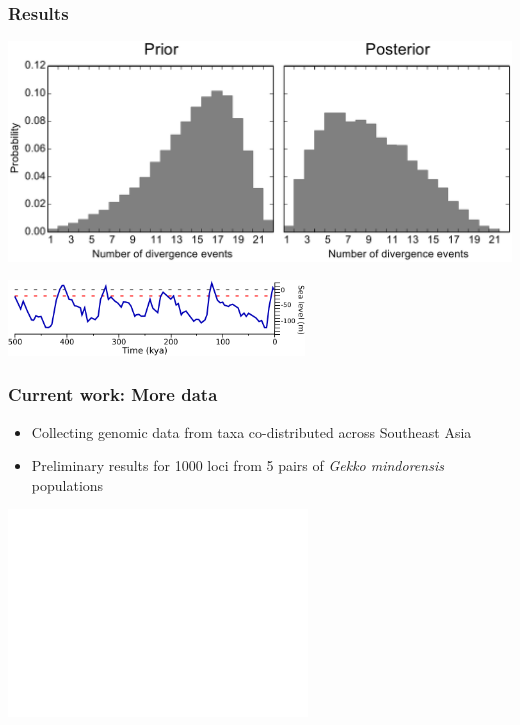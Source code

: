 \begin{frame}
    \frametitle{Results}
    \centerline{
    \includegraphics[width=\textwidth]{../../empirical-analyses/plots/philippines-dpp-psi-posterior-prior.pdf}}
    \smallskip
    \centerline{
    \includegraphics[height=2cm]{../images/sea-level-only.pdf}}
\end{frame}

\begin{frame}
    \frametitle{Current work: More data}
    \begin{itemize}
        \item<1-> Collecting genomic data from taxa co-distributed across Southeast
            Asia
        \item<2-> Preliminary results for 1000 loci from 5 pairs of \emph{Gekko
                mindorensis} populations
    \end{itemize}

    \begin{center}
        \includegraphics<2->[height=5.5cm]{../images/number-of-divs-gekko-mindorensis.pdf}
    \end{center}
\end{frame}

